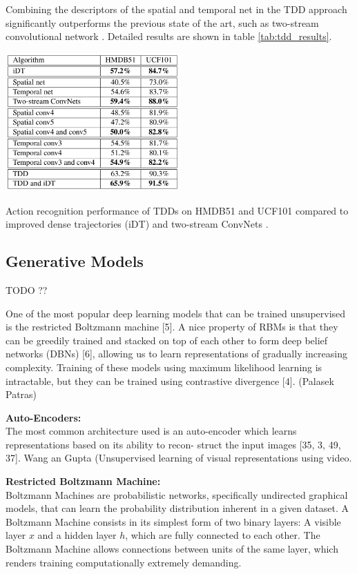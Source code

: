 Combining the descriptors of the spatial and temporal net in the TDD approach significantly outperforms the previous state of the art, such as two-stream convolutional network \cite{simonyan_two-stream_2014}.
Detailed results are shown in table \ref{tab:tdd_results}.

\begin{table}[H]
    \centering
    \includegraphics[width=0.5\textwidth]{img_deep/tdd_results}
    \caption{Action recognition performance of TDDs on HMDB51 and UCF101 compared to improved dense trajectories (iDT) \cite{wang_action_2013} and two-stream ConvNets \cite{simonyan_two-stream_2014}. \cite{wang_action_2015}}
    \label{tab:tdd_results}
\end{table}


\subsection{Generative Models}
\label{sec:generative}

TODO ??

One of the most popular deep learning models that can be trained unsupervised is the restricted Boltzmann machine [5]. A nice property of RBMs is that they can be greedily trained and stacked on top of each other to form deep belief networks (DBNs) [6], allowing us to learn representations of gradually increasing complexity. Training of these models using maximum likelihood learning is intractable, but they can be trained using contrastive divergence [4]. (Palasek Patras)

\textbf{Auto-Encoders:}\\
The most common architecture used is an auto-encoder
which learns representations based on its ability to recon-
struct the input images [35, 3, 49, 37]. Wang an Gupta (Unsupervised learning of visual representations using video.

\textbf{Restricted Boltzmann Machine:}\\
Boltzmann Machines are probabilistic networks, specifically undirected graphical models, that can learn the probability distribution inherent in a given dataset.
A Boltzmann Machine consists in its simplest form of two binary layers: A visible layer $x$ and a hidden layer $h$, which are fully connected to each other.
The Boltzmann Machine allows connections between units of the same layer, which renders training computationally extremely demanding.

